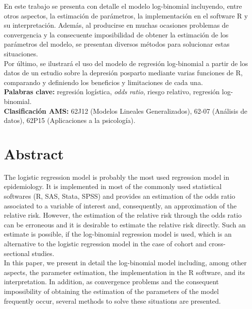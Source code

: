 \documentclass[twoside]{report}
\begin{document}
En este trabajo se presenta con detalle el modelo log-binomial incluyendo, entre otros aspectos, la estimación de parámetros, la implementación en el software R y su interpretación. Además, al producirse en muchas ocasiones problemas de convergencia y la consecuente imposibilidad de obtener la estimación de los parámetros del modelo, se presentan diversos métodos para solucionar estas situaciones. \\

Por último, se ilustrará el uso del modelo de regresión log-binomial a partir de los datos de un estudio sobre la depresión posparto mediante varias funciones de R, comparando y definiendo los beneficios y limitaciones de cada una.\\

\textbf{Palabras clave:} regresión logística,  \textit{odds ratio}, riesgo relativo, regresión log-binomial.\\

\textbf{Clasificación AMS:} 62J12 (Modelos Lineales Generalizados), 62-07 (Análisis de datos), 62P15 (Aplicaciones a la psicología). 

\chapter*{Abstract}
The logistic regression model is probably the most used regression model in epidemiology. It is implemented in most of the commonly used statistical softwares (R, SAS, Stata, SPSS) and provides an estimation of the odds ratio associated to a variable of interest and, consequently, an approximation of the relative risk. However, the estimation of the relative risk through the odds ratio can be erroneous and it is desirable to estimate the relative risk directly. Such an estimate is possible, if the log-binomial regression model is used, which is an alternative to the logistic regression model in the case of cohort and cross-sectional studies.\\

In this paper, we present in detail the log-binomial model including, among other aspects, the parameter estimation, the implementation in the R software, and its interpretation. In addition, as convergence problems and the consequent impossibility of obtaining the estimation of the parameters of the model frequently occur, several methods to solve these situations are presented. \\
\end{document}

